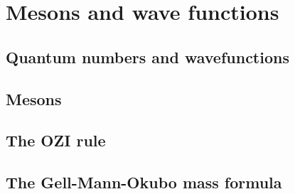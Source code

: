 \section{Mesons and wave functions}

\subsection{Quantum numbers and wavefunctions}

\subsection{Mesons}

\subsection{The OZI rule}

\subsection{The Gell-Mann-Okubo mass formula}
